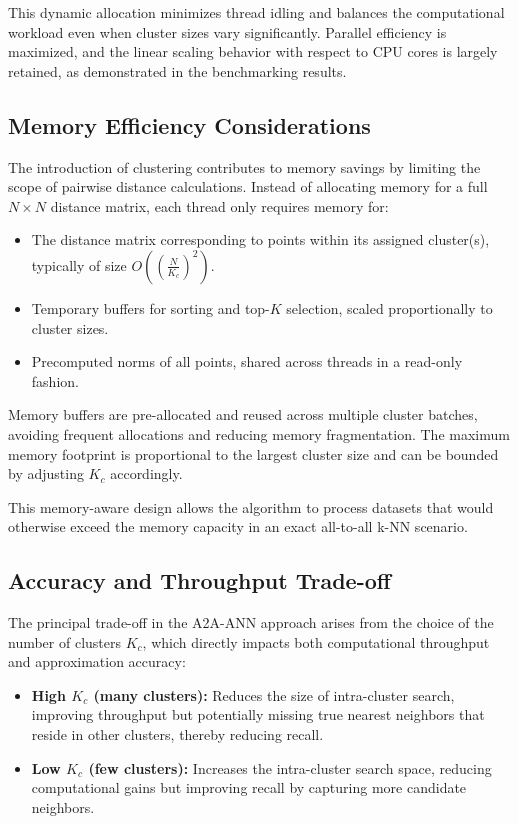 \documentclass[conference]{IEEEtran}
\begin{document}
This dynamic allocation minimizes thread idling and balances the computational workload even when cluster 
sizes vary significantly. Parallel efficiency is maximized, and the linear scaling behavior with respect to 
CPU cores is largely retained, as demonstrated in the benchmarking results.

\subsection{Memory Efficiency Considerations}

The introduction of clustering contributes to memory savings by limiting the scope of pairwise distance 
calculations. Instead of allocating memory for a full $N \times N$ distance matrix, each thread only requires 
memory for:
\begin{itemize}
    \item The distance matrix corresponding to points within its assigned cluster(s), typically of size 
    $O\left(\left(\frac{N}{K_c}\right)^2\right)$.
    \item Temporary buffers for sorting and top-$K$ selection, scaled proportionally to cluster sizes.
    \item Precomputed norms of all points, shared across threads in a read-only fashion.
\end{itemize}

Memory buffers are pre-allocated and reused across multiple cluster batches, avoiding frequent allocations and 
reducing memory fragmentation. The maximum memory footprint is proportional to the largest cluster size and can
be bounded by adjusting $K_c$ accordingly.

This memory-aware design allows the algorithm to process datasets that would otherwise exceed the memory capacity 
in an exact all-to-all k-NN scenario.

\subsection{Accuracy and Throughput Trade-off}

The principal trade-off in the A2A-ANN approach arises from the choice of the number of clusters $K_c$, 
which directly impacts both computational throughput and approximation accuracy:
\begin{itemize}
    \item \textbf{High $K_c$ (many clusters):} Reduces the size of intra-cluster search, improving throughput 
    but potentially missing true nearest neighbors that reside in other clusters, thereby reducing recall.
    \item \textbf{Low $K_c$ (few clusters):} Increases the intra-cluster search space, reducing computational 
    gains but improving recall by capturing more candidate neighbors.
\end{itemize}
\end{document}
